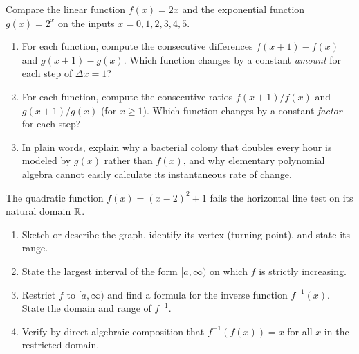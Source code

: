 \begin{exercise}
\label{ch02:exc-proportional-growth}
Compare the linear function $f(x) = 2x$ and the exponential function $g(x) = 2^x$ on
the inputs $x = 0, 1, 2, 3, 4, 5$.
\begin{enumerate}
  \item For each function, compute the consecutive differences $f(x+1) - f(x)$ and
        $g(x+1) - g(x)$. Which function changes by a constant \emph{amount} for each
        step of $\Delta x = 1$?
  \item For each function, compute the consecutive ratios $f(x+1)/f(x)$ and
        $g(x+1)/g(x)$ (for $x \ge 1$). Which function changes by a constant
        \emph{factor} for each step?
  \item In plain words, explain why a bacterial colony that doubles every hour is
        modeled by $g(x)$ rather than $f(x)$, and why elementary polynomial algebra
        cannot easily calculate its instantaneous rate of change.
\end{enumerate}
\end{exercise}

\begin{exercise}
\label{ch02:exc-restricted-inverses}
The quadratic function $f(x) = (x-2)^2 + 1$ fails the horizontal line test on its
natural domain $\mathbb{R}$.
\begin{enumerate}
  \item Sketch or describe the graph, identify its vertex (turning point), and state
        its range.
  \item State the largest interval of the form $[a, \infty)$ on which $f$ is strictly
        increasing.
  \item Restrict $f$ to $[a, \infty)$ and find a formula for the inverse function
        $f^{-1}(x)$. State the domain and range of $f^{-1}$.
  \item Verify by direct algebraic composition that $f^{-1}(f(x)) = x$ for all $x$
        in the restricted domain.
\end{enumerate}
\end{exercise}
